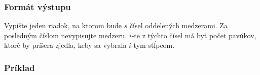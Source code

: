 \subsubsection{Formát výstupu}

Vypíšte jeden riadok, na ktorom bude $s$ čísel oddelených medzerami. Za posledným číslom nevypisujte medzeru.
$i$-te z týchto čísel má byť počet pavúkov, ktoré by príšera zjedla, keby sa vybrala $i$-tym stĺpcom.

\subsubsection{Príklad}

